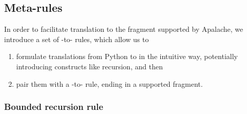 \subsection{ Meta-rules}

In order to facilitate translation to the \tlap{} fragment supported by Apalache, we introduce a set of \tlap{}-to-\tlap{} rules, which allow us to
\begin{enumerate}
\item formulate translations from Python to \tlap{} in the intuitive way, potentially introducing constructs like recursion, and then
\item pair them with a \tlap{}-to-\tlap{} rule, ending in a supported fragment.
\end{enumerate}

\subsubsection{Bounded recursion rule}

